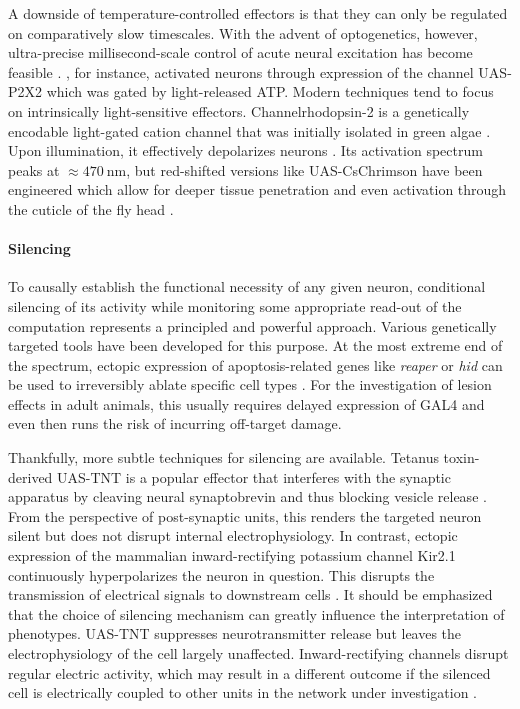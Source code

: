 A downside of temperature-controlled effectors is that they can only be regulated on comparatively slow timescales. With the advent of optogenetics, however, ultra-precise millisecond-scale control of acute neural excitation has become feasible \citep{Deisseroth:2011aa}. \citet{Lima:2005aa}, for instance, activated neurons through expression of the channel UAS-P2X2 which was gated by light-released ATP. Modern techniques tend to focus on intrinsically light-sensitive effectors. Channelrhodopsin-2 is a genetically encodable light-gated cation channel that was initially isolated in green algae \citep{Harz:1991aa,Nagel:2003aa}. Upon illumination, it effectively depolarizes neurons \citep{Boyden:2005aa,Nagel:2005aa}. Its activation spectrum peaks at $\approx\SI{470}{\nano\meter}$, but red-shifted versions like UAS-CsChrimson have been engineered which allow for deeper tissue penetration and even activation through the cuticle of the fly head \citep{Klapoetke:2014aa,Bath:2014aa}.

\paragraph{Silencing}
To causally establish the functional necessity of any given neuron, conditional silencing of its activity while monitoring some appropriate read-out of the computation represents a principled and powerful approach. Various genetically targeted tools have been developed for this purpose. At the most extreme end of the spectrum, ectopic expression of apoptosis-related genes like \textit{reaper} or \textit{hid} can be used to irreversibly ablate specific cell types \citep{Zhou:1997aa}. For the investigation of lesion effects in adult animals, this usually requires delayed expression of GAL4 and even then runs the risk of incurring off-target damage.

Thankfully, more subtle techniques for silencing are available. Tetanus toxin-derived UAS-TNT is a popular effector that interferes with the synaptic apparatus by cleaving neural synaptobrevin and thus blocking vesicle release \citep{Sweeney:1995tz}. From the perspective of post-synaptic units, this renders the targeted neuron silent but does not disrupt internal electrophysiology. In contrast, ectopic expression of the mammalian inward-rectifying potassium channel Kir2.1 continuously hyperpolarizes the neuron in question. This disrupts the transmission of electrical signals to downstream cells \citep{Baines:2001aa}. It should be emphasized that the choice of silencing mechanism can greatly influence the interpretation of phenotypes. UAS-TNT suppresses neurotransmitter release but leaves the electrophysiology of the cell largely unaffected. Inward-rectifying channels disrupt regular electric activity, which may result in a different outcome if the silenced cell is electrically coupled to other units in the network under investigation \citep[for a relevant example, see][]{Joesch:2010fw}.

